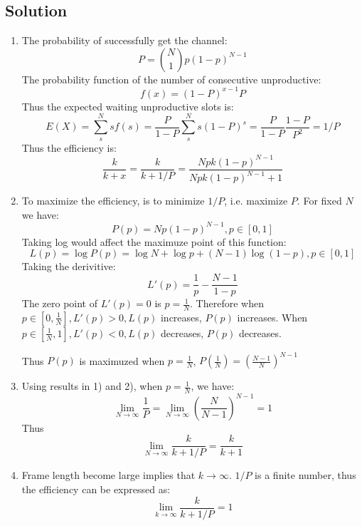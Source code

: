 \subsection*{Solution}

\begin{enumerate}
    \item The probability of successfully get the channel:
          $$P = {N \choose 1}p(1-p)^{N-1}$$
          The probability function of the number of consecutive unproductive:
          $$f(x) = (1-P)^{x-1}P$$
          Thus the expected waiting unproductive slots is:
          $$E(X) = \sum_s^N sf(s) = \frac{P}{1-P}\sum_s^N s(1-P)^s = \frac{P}{1-P}\frac{1-P}{P^2} = 1/P $$
          Thus the efficiency is:
          $$ \frac{k}{k+x} = \frac{k}{k+1/P} = \frac{Npk(1-p)^{N-1}}{Npk(1-p)^{N-1} + 1}$$

    \item To maximize the efficiency, is to minimize $1/P$, i.e. maximize $P$.
          For fixed $N$ we have: $$P(p) = Np(1-p)^{N-1}, p \in [0, 1]$$
          Taking log would affect the maximuze point of this function:
          $$L(p) = \log P(p) = \log N + \log p + (N-1)\log (1-p), p \in [0, 1]$$
          Taking the derivitive:
          $$L'(p) = \frac{1}{p} - \frac{N-1}{1-p}$$
          The zero point of $L'(p) = 0$ is $p = \frac{1}{N}$.
          Therefore when $p \in [0, \frac{1}{N}], L'(p) > 0, L(p)$ increases, $P(p)$ increases.
          When $p \in [\frac{1}{N}, 1], L'(p) < 0, L(p)$ decreases, $P(p)$ decreases.

          Thus $P(p)$ is maximuzed when $p = \frac{1}{N}$, $P(\frac{1}{N}) = (\frac{N-1}{N})^{N-1}$

    \item Using results in 1) and 2), when $p = \frac{1}{N}$, we have:
          $$\lim_{N \rightarrow \infty} \frac{1}{P} = \lim_{N \rightarrow \infty} (\frac{N}{N-1})^{N-1} = 1$$
          Thus $$\lim_{N \rightarrow \infty} \frac{k}{k + 1/P} = \frac{k}{k+1}$$

    \item Frame length become large implies that $k \rightarrow \infty$.
          $1/P$ is a finite number, thus the efficiency can be expressed as:
          $$ \lim_{k \rightarrow \infty} \frac{k}{k + 1/P} = 1$$
\end{enumerate}